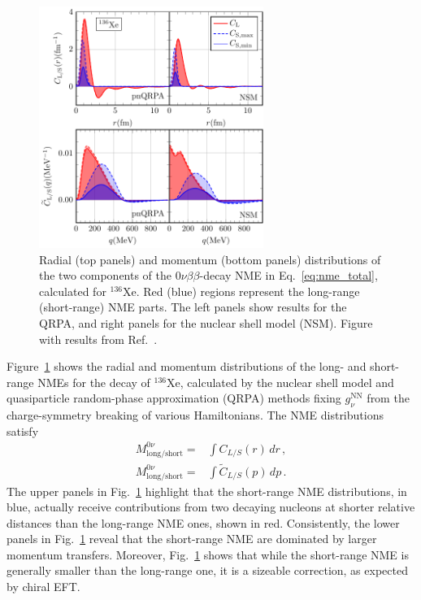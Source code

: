 \begin{figure}[t]
	\begin{center}
	\includegraphics[width=0.65\textwidth]{img/136Xe-QRPA-NSM.pdf}
	\caption{Radial (top panels) and momentum (bottom panels) distributions of the two components of the $0\nu\beta\beta$-decay NME in Eq.~\eqref{eq:nme_total}, calculated for $^{136}$Xe. Red (blue) regions represent the long-range (short-range) NME parts. The left panels show results for the QRPA, and right panels for the nuclear shell model (NSM). Figure with results from Ref.~\cite{Jokiniemi:2021qqv}. \label{fig:NME_density}}
\end{center}
\end{figure}

Figure~\ref{fig:NME_density} shows the radial and momentum distributions of the long- and short-range NMEs for the decay of $^{136}$Xe, calculated by the nuclear shell model and quasiparticle random-phase approximation (QRPA) methods fixing $g^\text{NN}_\nu$ from the charge-symmetry breaking of various Hamiltonians. The NME distributions satisfy
\begin{align}
M^{0\nu}_{\text{long/short}}=&\int C_{L/S}(r)\, d r\,, \\
M^{0\nu}_{\text{long/short}}=&\int \widetilde{C}_{L/S}(p)\, d p\,.
\end{align}
The upper panels in Fig.~\ref{fig:NME_density} highlight that the short-range NME distributions, in blue, actually receive contributions from two decaying nucleons at shorter relative distances than the long-range NME ones, shown in red. Consistently, the lower panels in Fig.~\ref{fig:NME_density} reveal that the short-range NME are dominated by larger momentum transfers. Moreover, Fig.~\ref{fig:NME_density} shows that while the short-range NME is generally smaller than the long-range one, it is a sizeable correction, as expected by chiral EFT.




